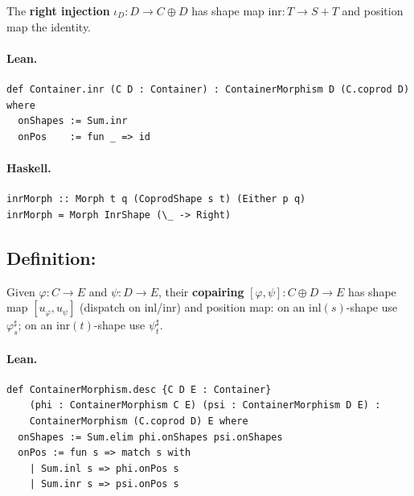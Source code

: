 \documentclass[11pt,a4paper]{article}
\begin{document}
\begin{defn}
The \textbf{right injection} $\iota_D : D \to C \oplus D$ has shape map
$\mathrm{inr} : T \to S + T$ and position map the identity.
\end{defn}

\paragraph{Lean.}
\begin{lstlisting}[style=lean]
def Container.inr (C D : Container) : ContainerMorphism D (C.coprod D) where
  onShapes := Sum.inr
  onPos    := fun _ => id
\end{lstlisting}

\paragraph{Haskell.}
\begin{lstlisting}[style=haskell]
inrMorph :: Morph t q (CoprodShape s t) (Either p q)
inrMorph = Morph InrShape (\_ -> Right)
\end{lstlisting}


\subsection{Definition: }

\begin{defn}[Copairing]
Given $\varphi : C \to E$ and $\psi : D \to E$, their \textbf{copairing}
$[\varphi, \psi] : C \oplus D \to E$ has shape map $[u_\varphi, u_\psi]$
(dispatch on $\mathrm{inl}$/$\mathrm{inr}$) and position map:
on an $\mathrm{inl}(s)$-shape use $\varphi^\sharp_s$; on an
$\mathrm{inr}(t)$-shape use $\psi^\sharp_t$.
\end{defn}

\paragraph{Lean.}
\begin{lstlisting}[style=lean]
def ContainerMorphism.desc {C D E : Container}
    (phi : ContainerMorphism C E) (psi : ContainerMorphism D E) :
    ContainerMorphism (C.coprod D) E where
  onShapes := Sum.elim phi.onShapes psi.onShapes
  onPos := fun s => match s with
    | Sum.inl s => phi.onPos s
    | Sum.inr s => psi.onPos s
\end{lstlisting}
\end{document}
